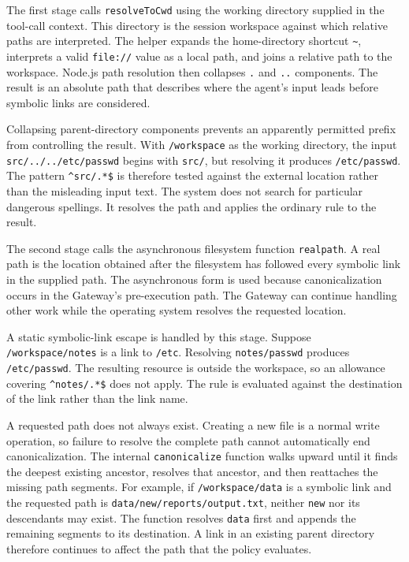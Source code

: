 The first stage calls \texttt{resolveToCwd} using the working directory supplied
in the tool-call context. This directory is the session workspace against which
relative paths are interpreted. The helper expands the home-directory shortcut
\texttt{\textasciitilde}, interprets a valid \texttt{file://} value as a local
path, and joins a relative path to the workspace. Node.js path resolution then
collapses \texttt{.} and \texttt{..} components. The result is an absolute path
that describes where the agent's input leads before symbolic links are
considered.

Collapsing parent-directory components prevents an apparently permitted prefix
from controlling the result. With \texttt{/workspace} as the working
directory, the input \texttt{src/../../etc/passwd} begins with
\texttt{src/}, but resolving it produces \texttt{/etc/passwd}. The pattern
\texttt{\^{}src/.*\$} is therefore tested against the external location rather
than the misleading input text. The system does not search for particular
dangerous spellings. It resolves the path and applies the ordinary rule to the
result.

The second stage calls the asynchronous filesystem function
\texttt{realpath}. A real path is the location obtained after the filesystem
has followed every symbolic link in the supplied path. The asynchronous form is
used because canonicalization occurs in the Gateway's pre-execution path. The
Gateway can continue handling other work while the operating system resolves
the requested location.

A static symbolic-link escape is handled by this stage. Suppose
\texttt{/workspace/notes} is a link to \texttt{/etc}. Resolving
\texttt{notes/passwd} produces \texttt{/etc/passwd}. The resulting resource is
outside the workspace, so an allowance covering
\texttt{\^{}notes/.*\$} does not apply. The rule is evaluated against the
destination of the link rather than the link name.

A requested path does not always exist. Creating a new file is a normal write
operation, so failure to resolve the complete path cannot automatically end
canonicalization. The internal \texttt{canonicalize} function walks upward
until it finds the deepest existing ancestor, resolves that ancestor, and then
reattaches the missing path segments. For example, if
\texttt{/workspace/data} is a symbolic link and the requested path is
\texttt{data/new/reports/output.txt}, neither \texttt{new} nor its descendants
may exist. The function resolves \texttt{data} first and appends the remaining
segments to its destination. A link in an existing parent directory therefore
continues to affect the path that the policy evaluates.

